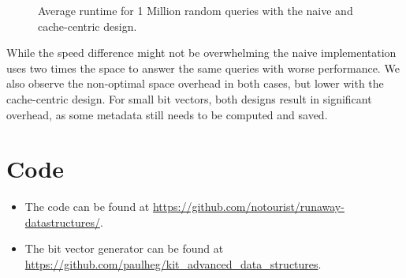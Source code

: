 \documentclass[a4paper,UKenglish,cleveref, autoref, thm-restate]{lipics-v2021}
\begin{document}
\begin{figure}
    \caption{Average runtime for 1 Million random queries with the naive and cache-centric design.}
    \label{fig:time}
\end{figure}
While the speed difference might not be overwhelming the naive implementation uses two times
the space to answer the same queries with worse performance. We also observe the non-optimal space overhead
in both cases, but lower with the cache-centric design. For small bit vectors, both designs result in significant overhead,
as some metadata still needs to be computed and saved.


\appendix
\section{Code}
\begin{itemize}
 \item The code can be found at \url{https://github.com/notourist/runaway-datastructures/}.
 \item The bit vector generator can be found at \url{https://github.com/paulheg/kit_advanced_data_structures}.
\end{itemize}
\end{document}
